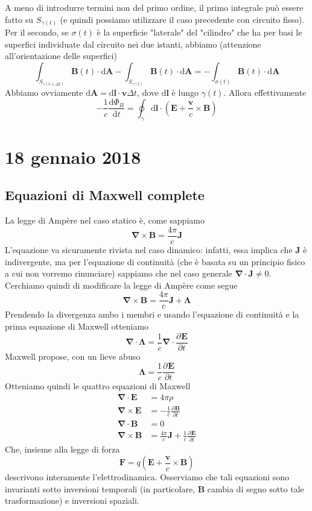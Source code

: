 \documentclass[a4paper,11pt]{book}
\newcommand{\dif}{\mathrm{d}}
\newcommand{\der}[3][]{\frac{\partial ^{#1}#2}{\partial {#3}^{#1}}}
\let\oldnabla\nabla
\renewcommand{\nabla}{\vec{\oldnabla}}
\renewcommand{\vec}[1]{\mathbf{#1}}
\theoremstyle{theorem}
\theoremstyle{definition}
\begin{document}
\begin{enumerate}
	A meno di introdurre termini non del primo ordine, il primo integrale può essere fatto su $S_{\gamma(t)}$ (e quindi possiamo utilizzare il caso precedente con circuito fisso). Per il secondo, se $\sigma(t)$ è la superficie "laterale" del "cilindro" che ha per basi le superfici individuate dal circuito nei due istanti, abbiamo (attenzione all'orientazione delle superfici)
	\[\int_{S_{\gamma(t+\Delta t)}}\vec{B}(t)\cdot\dif\vec{A}-\int_{S_{\gamma(t)}}\vec{B}(t)\cdot\dif\vec{A}=-\int_{\sigma(t)}\vec{B}(t)\cdot\dif\vec{A}\]
	Abbiamo ovviamente $\dif\vec{A}=\dif\vec{l}\cdot\vec{v}\Delta t$, dove $\dif\vec{l}$ è lungo $\gamma(t)$. Allora effettivamente
	\[-\frac{1}{c}\frac{\dif\Phi_B}{\dif t}=\oint_{\gamma}\dif\vec{l}\cdot\left(\vec{E}+\frac{\vec{v}}{c}\times\vec{B}\right)\]
\end{enumerate}
\newpage
\section{18 gennaio 2018}
\subsection{Equazioni di Maxwell complete}
La legge di Ampère nel caso statico è, come sappiamo
\[\nabla\times\vec{B}=\frac{4\pi}{c}\vec{J}\]
L'equazione va sicuramente rivista nel caso dinamico: infatti, essa implica che $\vec{J}$ è indivergente, ma per l'equazione di continuità (che è basata su un principio fisico a cui non vorremo rinunciare) sappiamo che nel caso generale $\nabla\cdot\vec{J}\neq0$. Cerchiamo quindi di modificare la legge di Ampère come segue
\[\nabla\times\vec{B}=\frac{4\pi}{c}\vec{J}+\vec{\Lambda}\]
Prendendo la divergenza ambo i membri e usando l'equazione di continuità e la prima equazione di Maxwell otteniamo
\[\nabla\cdot\vec{\Lambda}=\frac{1}{c}\nabla\cdot\der{\vec{E}}{t}\]
Maxwell propose, con un lieve abuso
\[\vec{\Lambda}=\frac{1}{c}\der{\vec{E}}{t}\]
Otteniamo quindi le quattro equazioni di Maxwell
\begin{subequations}
	\begin{align}
		\nabla\cdot\vec{E}&=4\pi\rho\nonumber\\
		\nabla\times\vec{E}&=-\frac{1}{c}\der{\vec{B}}{t}\nonumber\\
		\nabla\cdot\vec{B}&=0\nonumber\\
		\nabla\times\vec{B}&=\frac{4\pi}{c}\vec{J}+\frac{1}{c}\der{\vec{E}}{t}\nonumber	
	\end{align}
\end{subequations}
Che, insieme alla legge di forza
\[\vec{F}=q\left(\vec{E}+\frac{\vec{v}}{c}\times\vec{B}\right)\]
descrivono interamente l'elettrodinamica. Osserviamo che tali equazioni sono invarianti sotto inversioni temporali (in particolare, $\vec{B}$ cambia di segno sotto tale trasformazione) e inversioni spaziali.
\end{document}
